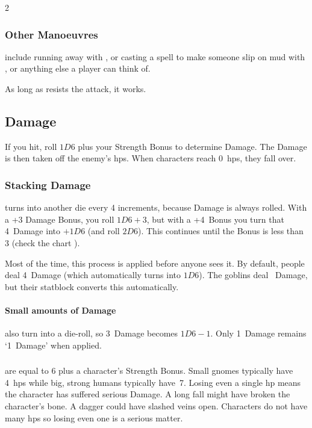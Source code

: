 \begin{multicols}{2}
\subsubsection{Other Manoeuvres}
include running away with , or casting a spell to make someone slip on mud with , or anything else a player can think of.

As long as  resists the attack, it works.

\begin{figure}[t!]
  \label{stackingDamageChart}%
  \stackingDamageChart
\end{figure}

\subsection{Damage}

If you hit, roll $1D6$ plus your Strength Bonus to determine Damage.
The Damage is then taken off the enemy's \glspl{hp}.
When characters reach 0~\glspl{hp}, they fall over.

\subsubsection{Stacking Damage}
\label{stackingDamage}
turns into another die every 4 increments, because Damage is always rolled.
With a +3 Damage Bonus, you roll $1D6+3$, but with a +4~Bonus you turn that 4~Damage into $+1D6$ (and roll $2D6$).
This continues until the Bonus is less than 3
(check the chart ).

Most of the time, this process is applied before anyone sees it.
By default, people deal 4~Damage (which automatically turns into $1D6$).
The goblins  deal ~Damage, but their \gls{statblock} converts this automatically.

\paragraph{Small amounts of Damage}
also turn into a die-roll, so 3~Damage becomes $1D6-1$.
Only 1~Damage remains `1~Damage' when applied.

\subsubsection{}
are equal to 6 plus a character's Strength Bonus.
Small gnomes typically have 4~\glspl{hp} while big, strong humans typically have~7.
Losing even a single \gls{hp} means the character has suffered serious Damage.
A long fall might have broken the character's bone.
A dagger could have slashed veins open.
Characters do not have many \glspl{hp} so losing even one is a serious matter.


\end{multicols}
